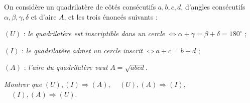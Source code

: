 On considère un quadrilatère de côtés consécutifs $a, b, c, d$, d'angles consécutifs $\alpha, \beta, \gamma, \delta$ et d'aire $A$, et les trois énoncés suivants :

$(U)$ : \emph{le quadrilatère est inscriptible dans un cercle} $\iff \alpha + \gamma = \beta + \delta = 180^\circ$ ;

$(I)$ : \emph{le quadrilatère admet un cercle inscrit} $\iff a + c = b + d$ ;

$(A)$ : \emph{l'aire du quadrilatère vaut} $A = \sqrt{abcd}$.

\emph{Montrer que} $(U), (I) \Rightarrow (A)$, $\quad (U), (A) \Rightarrow (I)$, $\quad (I), (A) \Rightarrow (U)$.
